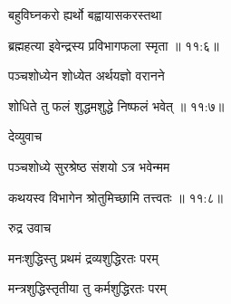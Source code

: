 {\devanagarifont बहुविघ्नकरो ह्यर्थो बह्वायासकरस्तथा \thinspace{\dandab} \dontdisplaylinenum }%


{\devanagarifont ब्रह्महत्या इवेन्द्रस्य प्रविभागफला स्मृता {॥ ११:६॥} \veg\dontdisplaylinenum }%

{\devanagarifont पञ्चशोध्येन शोध्येत अर्थयज्ञो वरानने \thinspace{\dandab} \dontdisplaylinenum }%


{\devanagarifont शोधिते तु फलं शुद्धमशुद्धे निष्फलं भवेत् {॥ ११:७॥} \veg\dontdisplaylinenum }%

{\devanagarifont देव्युवाच {\dandab}\dontdisplaylinenum  }%

{\devanagarifont पञ्चशोध्ये सुरश्रेष्ठ संशयो ऽत्र भवेन्मम \thinspace{\danda} \dontdisplaylinenum }%


{\devanagarifont कथयस्व विभागेन श्रोतुमिच्छामि तत्त्वतः {॥ ११:८॥} \veg\dontdisplaylinenum }%
 
{\devanagarifont रुद्र उवाच {\dandab}\dontdisplaylinenum  }%
 
{\devanagarifont मनःशुद्धिस्तु प्रथमं द्रव्यशुद्धिरतः परम् \thinspace{\danda} \dontdisplaylinenum }%

{\devanagarifont मन्त्रशुद्धिस्तृतीया तु कर्मशुद्धिरतः परम्  \danda\dontdisplaylinenum }%

